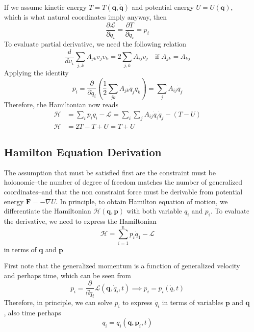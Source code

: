 \documentclass[../../../main.tex]{subfiles}
\begin{document}
If we assume kinetic energy $T=T(\mathbf{q},\dot{\mathbf{q}})$ and potential energy $U=U(\mathbf{q})$, which is what natural coordinates imply anyway, then
\begin{equation*}
	\frac{\partial \mathcal{L}}{\partial \dot{q}_i}=\frac{\partial T}{\partial \dot{q}_i}=p_i
\end{equation*}
To evaluate partial derivative, we need the following relation
\begin{equation*}
	\frac{d}{dv_i}\sum_{j,k}A_{jk}v_jv_k=2\sum_{j,k}A_{ij}v_j\quad\text{if }A_{jk}=A_{kj}
\end{equation*}
Applying the identity
\begin{equation*}
	p_i=\frac{\partial}{\partial \dot{q}_i}\left(\frac{1}{2}\sum_{jk}A_{jk}\dot{q}_j\dot{q}_k\right)=\sum_jA_{ij}\dot{q}_j\end{equation*}
Therefore, the Hamiltonian now reads
\begin{align*}
	\mathcal{H} & =\sum_ip_i\dot{q}_i-\mathcal{L}=\sum_i\sum_jA_{ij}\dot{q}_i\dot{q}_j-(T-U) \\
	\mathcal{H} & =2T-T+U=T+U
\end{align*}

\subsection*{Hamilton Equation Derivation}
The assumption that must be satisfied first are the constraint must be holonomic--the number of degree of freedom matches the number of generalized coordinates--and that the non constraint force must be derivable from potential energy $\mathbf{F}=-\nabla U$.
In principle, to obtain Hamilton equation of motion, we differentiate the Hamiltonian $\mathcal{H}(\mathbf{q},\mathbf{p})$ with both variable $q_i$ and $p_i$.
To evaluate the derivative, we need to express the Hamiltonian
\begin{equation*}
	\mathcal{H}=\sum_{i=1}^{n}p_i\dot{q}_1-\mathcal{L}
\end{equation*}
in terms of $\mathbf{q}$ and $\mathbf{p}$

First note that the generalized momentum is a function of generalized velocity and perhaps time, which can be seen from
\begin{equation*}
	p_i=\frac{\partial}{\partial \dot{q}_i}\mathcal{L}(\mathbf{q},\dot{q}_i,t)\implies p_i=p_i\left(\dot{q},t\right)
\end{equation*}
Therefore, in principle, we can solve $p_i$ to express $\dot{q}_i$ in terms of variables $\mathbf{p}$ and $\mathbf{q}$, also time perhaps
\begin{equation*}
	\dot{q}_i=\dot{q}_i(\mathbf{q},\mathbf{p}_i,t)
\end{equation*}
\end{document}
